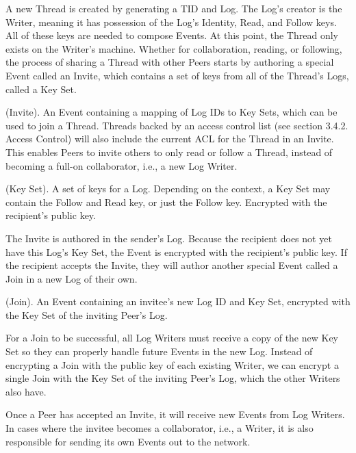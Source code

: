 \documentclass{comjnl}
\begin{document}
A new Thread is created by generating a TID and Log. The Log’s creator is the Writer, meaning it has possession of the Log’s Identity, Read, and Follow keys. All of these keys are needed to compose Events. At this point, the Thread only exists on the Writer’s machine. Whether for collaboration, reading, or following, the process of sharing a Thread with other Peers starts by authoring a special Event called an Invite, which contains a set of keys from all of the Thread’s Logs, called a Key Set.

\begin{definition}
(Invite). An Event containing a mapping of Log IDs to Key Sets, which can be used to join a Thread. Threads backed by an access control list (see section 3.4.2. Access Control) will also include the current ACL for the Thread in an Invite. This enables Peers to invite others to only read or follow a Thread, instead of becoming a full-on collaborator, i.e., a new Log Writer.
\end{definition}

\begin{definition}
(Key Set). A set of keys for a Log. Depending on the context, a Key Set may contain the Follow and Read key, or just the Follow key. Encrypted with the recipient’s public key.
\end{definition}

The Invite is authored in the sender’s Log. Because the recipient does not yet have this Log’s Key Set, the Event is encrypted with the recipient’s public key. If the recipient accepts the Invite, they will author another special Event called a Join in a new Log of their own.

\begin{definition}
(Join). An Event containing an invitee’s new Log ID and Key Set, encrypted with the Key Set of the inviting Peer’s Log.
\end{definition}

For a Join to be successful, all Log Writers must receive a copy of the new Key Set so they can properly handle future Events in the new Log. Instead of encrypting a Join with the public key of each existing Writer, we can encrypt a single Join with the Key Set of the inviting Peer’s Log, which the other Writers also have.

Once a Peer has accepted an Invite, it will receive new Events from Log Writers. In cases where the invitee becomes a collaborator, i.e., a Writer, it is also responsible for sending its own Events out to the network.
\end{document}
